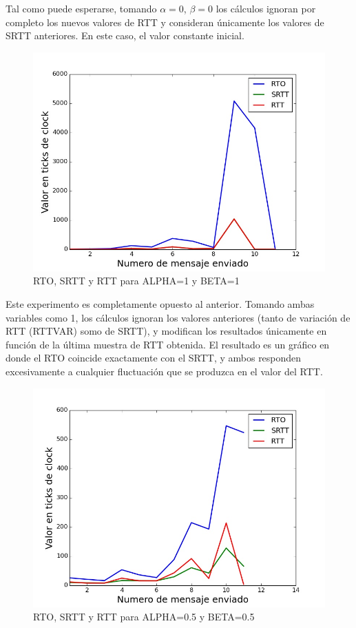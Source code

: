 Tal como puede esperarse, tomando $\alpha=0$, $\beta=0$ los cálculos ignoran por completo los nuevos
valores de RTT y consideran únicamente los valores de SRTT anteriores. En este caso, el valor constante
inicial.

\begin{figure}[H]
  \begin{center}
      \includegraphics[scale=0.32]{imagenes/ALPHA_1_BETA_1.jpg}
      \caption{RTO, SRTT y RTT para ALPHA=1 y BETA=1}
  \end{center}
\end{figure}

Este experimento es completamente opuesto al anterior. Tomando ambas variables como 1, los cálculos
ignoran los valores anteriores (tanto de variación de RTT (RTTVAR) somo de SRTT), y modifican
los resultados únicamente en función de la última muestra de RTT obtenida. El resultado es un gráfico
en donde el RTO coincide exactamente con el SRTT, y ambos responden excesivamente a cualquier fluctuación
que se produzca en el valor del RTT.


\begin{figure}[H]
  \begin{center}
      \includegraphics[scale=0.32]{imagenes/ALPHA_050_BETA_050.jpg}
      \caption{RTO, SRTT y RTT para ALPHA=0.5 y BETA=0.5}
  \end{center}
\end{figure}

